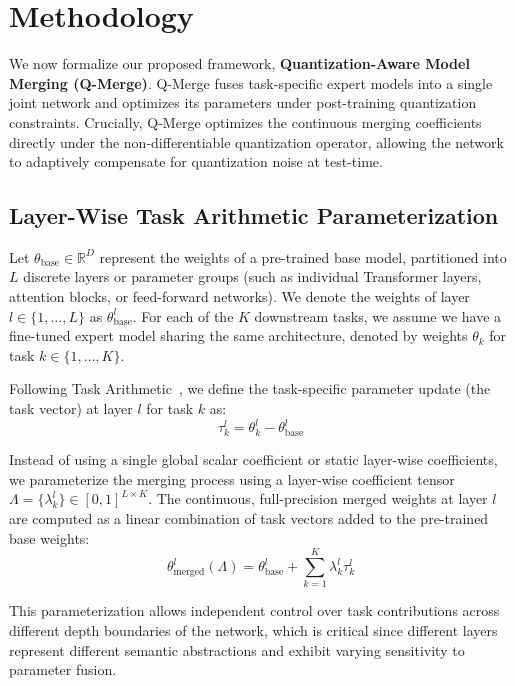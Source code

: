 \section{Methodology}
\label{sec:methodology}

We now formalize our proposed framework, \textbf{Quantization-Aware Model Merging (Q-Merge)}. Q-Merge fuses task-specific expert models into a single joint network and optimizes its parameters under post-training quantization constraints. Crucially, Q-Merge optimizes the continuous merging coefficients directly under the non-differentiable quantization operator, allowing the network to adaptively compensate for quantization noise at test-time.

\subsection{Layer-Wise Task Arithmetic Parameterization}
Let $\theta_{\text{base}} \in \mathbb{R}^D$ represent the weights of a pre-trained base model, partitioned into $L$ discrete layers or parameter groups (such as individual Transformer layers, attention blocks, or feed-forward networks). We denote the weights of layer $l \in \{1, \dots, L\}$ as $\theta^l_{\text{base}}$. For each of the $K$ downstream tasks, we assume we have a fine-tuned expert model sharing the same architecture, denoted by weights $\theta_k$ for task $k \in \{1, \dots, K\}$.

Following Task Arithmetic~\cite{ilharco2022editing}, we define the task-specific parameter update (the task vector) at layer $l$ for task $k$ as:
\begin{equation}
    \tau^l_k = \theta^l_k - \theta^l_{\text{base}}
\end{equation}

Instead of using a single global scalar coefficient or static layer-wise coefficients, we parameterize the merging process using a layer-wise coefficient tensor $\Lambda = \{\lambda^l_k\} \in [0, 1]^{L \times K}$. The continuous, full-precision merged weights at layer $l$ are computed as a linear combination of task vectors added to the pre-trained base weights:
\begin{equation}
    \theta^l_{\text{merged}}(\Lambda) = \theta^l_{\text{base}} + \sum_{k=1}^K \lambda^l_k \tau^l_k
\end{equation}

This parameterization allows independent control over task contributions across different depth boundaries of the network, which is critical since different layers represent different semantic abstractions and exhibit varying sensitivity to parameter fusion.

